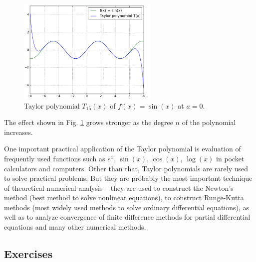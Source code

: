 \documentclass[article,A4,12pt]{llncs}
\begin{document}
\begin{figure}[!ht]
\begin{center}
\includegraphics[width=0.6\textwidth]{img/taylor-4.png}
\end{center}
\vspace{-2mm}
\caption{Taylor polynomial $T_{15}(x)$ of $f(x) = \sin(x)$ at $a = 0$.}
\label{fig:taylor-4}
\end{figure}
\noindent
The effect shown in Fig.  \ref{fig:taylor-4} grows stronger as the degree 
$n$ of the polynomial increases. 

One important practical application of the Taylor polynomial is evaluation of 
frequently used functions such as $e^x$, $\sin(x)$, $\cos(x)$, $\log(x)$ 
in pocket calculators and computers. 
Other than that, Taylor polynomials are rarely used to solve practical problems.
But they are probably the most 
important technique of theoretical numerical analysis -- they are used to construct
the Newton's method (best method to solve nonlinear equations), to construct 
Runge-Kutta methods (most widely used methods to solve ordinary differential 
equations), as well as to analyze convergence of finite difference methods 
for partial differential equations and many other numerical methods. 

\subsection{Exercises}
\end{document}
